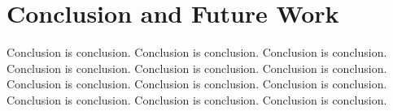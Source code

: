 \section{Conclusion and Future Work}

Conclusion is conclusion. Conclusion is conclusion. Conclusion is conclusion. Conclusion is conclusion. Conclusion is conclusion. Conclusion is conclusion. Conclusion is conclusion. Conclusion is conclusion. Conclusion is conclusion. Conclusion is conclusion. Conclusion is conclusion. Conclusion is conclusion. 
